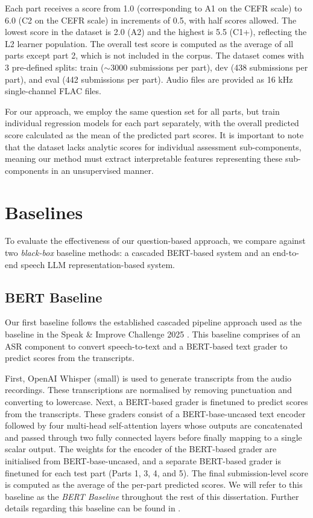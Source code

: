 \documentclass{report}
\begin{document}
Each part receives a score from 1.0 (corresponding to A1 on the CEFR scale) to 6.0 (C2 on the CEFR scale) in increments of 0.5, with half scores allowed. The lowest score in the dataset is 2.0 (A2) and the highest is 5.5 (C1+), reflecting the L2 learner population. The overall test score is computed as the average of all parts except part 2, which is not included in the corpus. The dataset comes with 3 pre-defined splits: train ($\sim$3000 submissions per part), dev (438 submissions per part), and eval (442 submissions per part). Audio files are provided as 16 kHz single-channel FLAC files.

For our approach, we employ the same question set for all parts, but train individual regression models for each part separately, with the overall predicted score calculated as the mean of the predicted part scores. It is important to note that the dataset lacks analytic scores for individual assessment sub-components, meaning our method must extract interpretable features representing these sub-components in an unsupervised manner.

\section{Baselines}
\label{sec:baselines}
To evaluate the effectiveness of our question-based approach, we compare against two \emph{black-box} baseline methods: a cascaded BERT-based system and an end-to-end speech LLM representation-based system.

\subsection{BERT Baseline}
Our first baseline follows the established cascaded pipeline approach used as the baseline in the Speak \& Improve Challenge 2025 \citep{qian2024sandi}. This baseline comprises of an ASR component to convert speech-to-text and a BERT-based text grader to predict scores from the transcripts.

First, OpenAI Whisper (small) \citep{whisper} is used to generate transcripts from the audio recordings. These transcriptions are normalised by removing punctuation and converting to lowercase. Next, a BERT-based grader is finetuned to predict scores from the transcripts. These graders consist of a BERT-base-uncased \citep{devlin2019bertpretrainingdeepbidirectional} text encoder followed by four multi-head self-attention layers whose outputs are concatenated and passed through two fully connected layers before finally mapping to a single scalar output. The weights for the encoder of the BERT-based grader are initialised from BERT-base-uncased, and a separate BERT-based grader is finetuned for each test part (Parts 1, 3, 4, and 5). The final submission-level score is computed as the average of the per-part predicted scores. We will refer to this baseline as the \emph{BERT Baseline} throughout the rest of this dissertation. Further details regarding this baseline can be found in \citet{qian2024sandi}.
\end{document}

